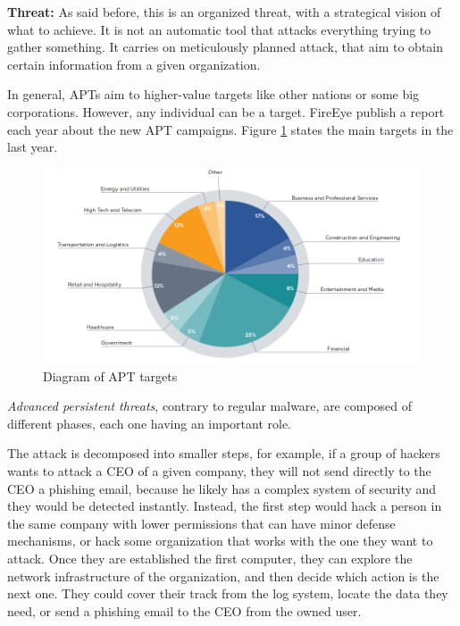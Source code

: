 \textbf{Threat:} As said before, this is an organized threat, with a strategical vision of what to achieve. It is not an automatic tool that attacks everything trying to gather something. It carries on meticulously planned attack, that aim to obtain certain information from a given organization. 

In general, APTs aim to higher-value targets like other nations or some big corporations. However, any individual can be a target. FireEye publish a report each year about the new APT campaigns. Figure \ref{fig:diag} states the main targets in the last year.\\

\begin{figure}[!h]
	\centering
	\includegraphics[width=1.0\columnwidth]{graph}
	\caption{Diagram of APT targets}
	\label{fig:diag}
\end{figure}





\textit{Advanced persistent threats}, contrary to regular malware, are composed of different phases, each one having an important role. 

The attack is decomposed into smaller steps, for example, if a group of hackers wants to attack a CEO of a given company, they will not send directly to the CEO a phishing email, because he likely has a complex system of security and they would be detected instantly. 
Instead, the first step would hack a person in the same company with lower permissions that can have minor defense mechanisms, or hack some organization that works with the one they want to attack. Once they are established the first computer, they can explore the network infrastructure of the organization, and then decide which action is the next one.
They could cover their track from the log system, locate the data they need, or send a phishing email to the CEO from the owned user.

